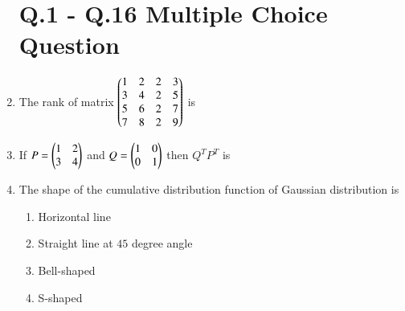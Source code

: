 \documentclass[journal,12pt,onecolumn]{article}
\theoremstyle{remark}
\begin{document}
\begin{enumerate}
\section*{Q.1 - Q.16 Multiple Choice Question}

\item The rank of matrix $\begin{pmatrix}1 & 2 & 2 & 3 \\ 3 & 4 & 2 & 5 \\ 5 & 6 & 2 & 7 \\ 7 & 8 & 2 & 9\end{pmatrix}$ is

\hfill{}
\begin{enumerate}
\end{enumerate}

\item If $P = \begin{pmatrix}1 & 2 \\ 3 & 4\end{pmatrix}$ and $Q = \begin{pmatrix}1 & 0 \\ 0 & 1\end{pmatrix}$ then $Q^T P^T$ is

\hfill{}
\begin{enumerate}
\end{enumerate}

\item The shape of the cumulative distribution function of Gaussian distribution is

\hfill{}
\begin{enumerate}
    \item Horizontal line
    \item Straight line at $45$ degree angle
    \item Bell-shaped
    \item S-shaped
\end{enumerate}


\end{enumerate}
\end{document}

